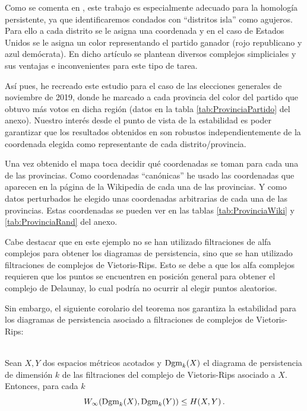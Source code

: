 Como se comenta en \cite{votosArticulo}, este trabajo es especialmente adecuado para la homología persistente, ya que identificaremos condados con ``distritos isla'' como agujeros. Para ello a cada distrito se le asigna una coordenada y en el caso de Estados Unidos se le asigna un color representando el partido ganador (rojo republicano y azul demócrata). En dicho artículo se plantean diversos complejos simpliciales y sus ventajas e inconvenientes para este tipo de tarea.

Así pues, he recreado este estudio para el caso de las elecciones generales de noviembre de 2019, donde he marcado a cada provincia del color del partido que obtuvo más votos en dicha región (datos en la tabla \ref{tab:ProvinciaPartido} del anexo). Nuestro interés desde el punto de vista de la estabilidad es poder garantizar que los resultados obtenidos en \cite{votosArticulo} son robustos independientemente de la coordenada elegida como representante de cada distrito/provincia.

Una vez obtenido el mapa toca decidir qué coordenadas se toman para cada una de las provincias. Como coordenadas ``canónicas'' he usado las coordenadas que aparecen en la página de la Wikipedia de cada una de las provincias. Y como datos perturbados he elegido unas coordenadas arbitrarias de cada una de las provincias. Estas coordenadas se pueden ver en las tablas \ref{tab:ProvinciaWiki} y \ref{tab:ProvinciaRand} del anexo.

Cabe destacar que en este ejemplo no se han utilizado filtraciones de alfa complejos para obtener los diagramas de persistencia, sino que se han utilizado filtraciones de complejos de Vietoris-Rips. Esto se debe a que los alfa complejos requieren que los puntos se encuentren en posición general para obtener el complejo de Delaunay, lo cual podría no ocurrir al elegir puntos aleatorios.

Sin embargo, el siguiente corolario del teorema \cite[Theorem~5.2]{persistenciaRips} nos garantiza la estabilidad para los diagramas de persistencia asociado a filtraciones de complejos de Vietoris-Rips:

\begin{corollary}
$ $\\
Sean $X, Y$ dos espacios métricos acotados y $\text{\rm Dgm}_k(X)$ el diagrama de persistencia de dimensión $k$ de las filtraciones del complejo de Vietoris-Rips asociado a $X$. Entonces, para cada $k$
\[
W_\infty(\text{\rm Dgm}_k(X), \text{\rm Dgm}_k(Y)) \leq H(X, Y)\,.
\]
\end{corollary}

